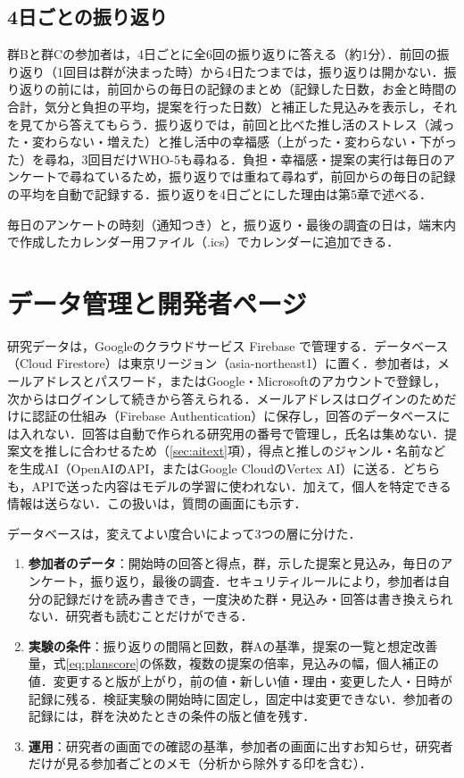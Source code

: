 \subsection{4日ごとの振り返り}
群Bと群Cの参加者は，4日ごとに全6回の振り返りに答える（約1分）．前回の振り返り（1回目は群が決まった時）から4日たつまでは，振り返りは開かない．振り返りの前には，前回からの毎日の記録のまとめ（記録した日数，お金と時間の合計，気分と負担の平均，提案を行った日数）と補正した見込みを表示し，それを見てから答えてもらう．振り返りでは，前回と比べた推し活のストレス（減った・変わらない・増えた）と推し活中の幸福感（上がった・変わらない・下がった）を尋ね，3回目だけWHO-5も尋ねる．負担・幸福感・提案の実行は毎日のアンケートで尋ねているため，振り返りでは重ねて尋ねず，前回からの毎日の記録の平均を自動で記録する．振り返りを4日ごとにした理由は第5章で述べる．

毎日のアンケートの時刻（通知つき）と，振り返り・最後の調査の日は，端末内で作成したカレンダー用ファイル（.ics）でカレンダーに追加できる．

\section{データ管理と開発者ページ}\label{sec:data}
研究データは，Googleのクラウドサービス Firebase で管理する．データベース（Cloud Firestore）は東京リージョン（asia-northeast1）に置く．参加者は，メールアドレスとパスワード，またはGoogle・Microsoftのアカウントで登録し，次からはログインして続きから答えられる．メールアドレスはログインのためだけに認証の仕組み（Firebase Authentication）に保存し，回答のデータベースには入れない．回答は自動で作られる研究用の番号で管理し，氏名は集めない．提案文を推しに合わせるため（\ref{sec:aitext}項），得点と推しのジャンル・名前などを生成AI（OpenAIのAPI，またはGoogle CloudのVertex AI）に送る．どちらも，APIで送った内容はモデルの学習に使われない．加えて，個人を特定できる情報は送らない．この扱いは，質問の画面にも示す．

データベースは，変えてよい度合いによって3つの層に分けた．
\begin{enumerate}
\item \textbf{参加者のデータ}：開始時の回答と得点，群，示した提案と見込み，毎日のアンケート，振り返り，最後の調査．セキュリティルールにより，参加者は自分の記録だけを読み書きでき，一度決めた群・見込み・回答は書き換えられない．研究者も読むことだけができる．
\item \textbf{実験の条件}：振り返りの間隔と回数，群Aの基準，提案の一覧と想定改善量，式\eqref{eq:planscore}の係数，複数の提案の倍率，見込みの幅，個人補正の値．変更すると版が上がり，前の値・新しい値・理由・変更した人・日時が記録に残る．検証実験の開始時に固定し，固定中は変更できない．参加者の記録には，群を決めたときの条件の版と値を残す．
\item \textbf{運用}：研究者の画面での確認の基準，参加者の画面に出すお知らせ，研究者だけが見る参加者ごとのメモ（分析から除外する印を含む）．
\end{enumerate}

